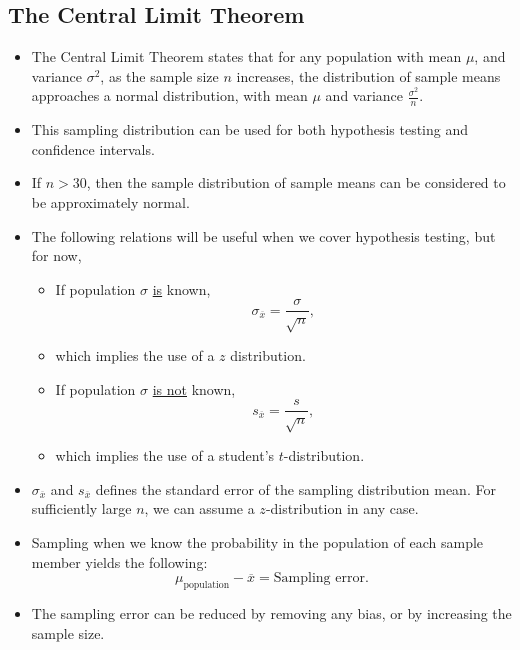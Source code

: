 \documentclass[../notes_compiled.tex]{subfiles}
\begin{document}
\subsection{The Central Limit Theorem}
\begin{itemize}
\item The Central Limit Theorem states that for any population with mean $\mu$, and variance $\sigma^{2}$, as the sample size $n$ increases, the distribution of sample means approaches a normal distribution, with mean $\mu$ and variance $\frac{\sigma^{2}}{n}$.
\item This sampling distribution can be used for both hypothesis testing and confidence intervals.
\item If $n>30$, then the sample distribution of sample means can be considered to be approximately normal.
\item The following relations will be useful when we cover hypothesis testing, but for now, 
\begin{itemize}
\item If population $\sigma$ \underline{is} known,
\begin{equation}
\sigma_{\overline{x}} = \frac{\sigma}{\sqrt{n}},\label{std-err-pop}
\end{equation}
\item[] which implies the use of a $z$ distribution.
\item If population $\sigma$ \underline{is not} known,
\begin{equation}
s_{\overline{x}} = \frac{s}{\sqrt{n}},\label{std-err-smp}
\end{equation}
\item[] which implies the use of a student's $t$-distribution.
\end{itemize}
\item[] $\sigma_{\overline{x}}$ and $s_{\overline{x}}$ defines the standard error of the sampling distribution mean. For sufficiently large $n$, we can assume a $z$-distribution in any case.
\item Sampling when we know the probability in the population of each sample member yields the following:
\begin{equation}
\mu_{\text{population}} - \overline{x} = \text{Sampling error}.
\end{equation}
\item[] The sampling error can be reduced by removing any bias, or by increasing the sample size.
\end{itemize}
\end{document}
